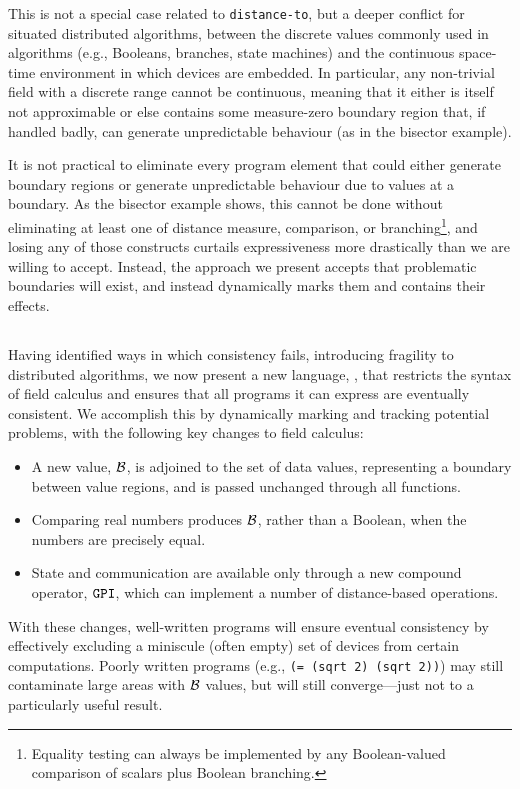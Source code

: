 \documentclass[12pt,a4paper,twoside,openright]{book}
\begin{document}
This is not a special case related to {\tt distance-to}, but a deeper conflict for situated distributed algorithms, between the discrete values commonly used in algorithms (e.g., Booleans, branches, state machines) and the continuous space-time environment in which devices are embedded.
%
In particular, any non-trivial field with a discrete range cannot be continuous, meaning that it either is itself not approximable or else contains some measure-zero boundary region that, if handled badly, can generate unpredictable behaviour (as in the bisector example).

It is not practical to eliminate every program element that could either generate boundary regions or generate unpredictable behaviour due to values at a boundary.
%
As the bisector example shows, this cannot be done without eliminating at least one of distance measure, comparison, or branching\footnote{Equality testing can always be implemented by any Boolean-valued comparison of scalars plus Boolean branching.}, and losing any of those constructs curtails expressiveness more drastically than we are willing to accept.
%
Instead, the approach we present accepts that problematic boundaries will exist, and instead dynamically marks them and contains their effects.

\subsection{\calculus}
\label{s:calculus}

Having identified ways in which consistency fails, introducing fragility to distributed algorithms, we now present a new language, \calculus{}, that restricts the syntax of field calculus and ensures that all programs it can express are eventually consistent.
%
We accomplish this by dynamically marking and tracking potential problems, with the following key changes to field calculus:
\begin{itemize}
\item A new value, $\mathcal{B}$, is adjoined to the set of data values, representing a boundary between value regions, and is passed unchanged through all functions.
\item Comparing real numbers produces $\mathcal{B}$, rather than a Boolean, when the numbers are precisely equal.
\item State and communication are available only through a new compound operator, $\texttt{GPI}$, which can implement a number of distance-based operations.
\end{itemize}
With these changes, well-written programs will ensure eventual consistency by effectively excluding a miniscule (often empty) set of devices from certain computations.
%
Poorly written programs (e.g., {\tt (= (sqrt 2) (sqrt 2))}) may still contaminate large areas with $\mathcal{B}$ values, but will still converge---just not to a particularly useful result.
\end{document}
